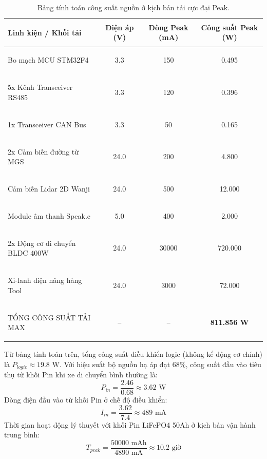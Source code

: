 \documentclass{article}
\begin{document}
\begin{table}[H]
\centering
\begin{tabularx}{\textwidth}{|>{\bfseries\raggedright\arraybackslash}X|c|c|c|}
\hline
\rowcolor{lightgray} Linh kiện / Khối tải & Điện áp (V) & Dòng Peak (mA) & Công suất Peak (W) \\ \hline
Bo mạch MCU STM32F4 & 3.3 & 150 & 0.495 \\ \hline
5x Kênh Transceiver RS485 & 3.3 & 120 & 0.396 \\ \hline
1x Transceiver CAN Bus & 3.3 & 50 & 0.165 \\ \hline
2x Cảm biến đường từ MGS & 24.0 & 200 & 4.800 \\ \hline
Cảm biến Lidar 2D Wanji & 24.0 & 500 & 12.000 \\ \hline
Module âm thanh Speak.c & 5.0 & 400 & 2.000 \\ \hline
2x Động cơ di chuyển BLDC 400W & 24.0 & 30000 & 720.000 \\ \hline
Xi-lanh điện nâng hàng Tool & 24.0 & 3000 & 72.000 \\ \hline
\rowcolor{lightgray} TỔNG CÔNG SUẤT TẢI MAX & -- & -- & \textbf{811.856 W} \\ \hline
\end{tabularx}
\caption{Bảng tính toán công suất nguồn ở kịch bản tải cực đại Peak.}
\label{tab:power_calc}
\end{table}

Từ bảng tính toán trên, tổng công suất điều khiển logic (không kể động cơ chính) là $P_{logic} \approx 19.8\text{ W}$. Với hiệu suất bộ nguồn hạ áp đạt $68\%$, công suất đầu vào tiêu thụ từ khối Pin khi xe di chuyển bình thường là:
\begin{equation}
    P_{in} = \frac{2.46}{0.68} \approx 3.62\text{ W}
\end{equation}
Dòng điện đầu vào từ khối Pin ở chế độ điều khiển:
\begin{equation}
    I_{in} = \frac{3.62}{7.4} \approx 489\text{ mA}
\end{equation}
Thời gian hoạt động lý thuyết với khối Pin LiFePO4 50Ah ở kịch bản vận hành trung bình:
\begin{equation}
    T_{peak} = \frac{50000\text{ mAh}}{4890\text{ mA}} \approx 10.2\text{ giờ}
\end{equation}
\end{document}
